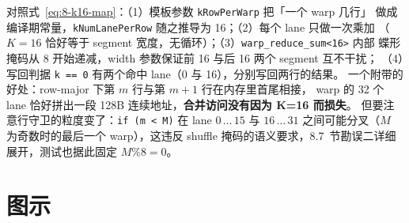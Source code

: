 对照式~\ref{eq:8-k16-map}：（1）模板参数 \texttt{kRowPerWarp} 把「一个 warp 几行」
做成编译期常量，\texttt{k\allowbreak{}Num\allowbreak{}Lane\allowbreak{}Per\allowbreak{}Row} 随之推导为 16；（2）每个 lane 只做一次乘加
（$K=16$ 恰好等于 segment 宽度，无循环）；（3）\texttt{warp\_\allowbreak{}reduce\_\allowbreak{}sum\allowbreak{}<16>} 内部
蝶形掩码从 8 开始递减，width 参数保证前 16 与后 16 两个 segment 互不干扰；
（4）写回判据 \texttt{k == 0} 有两个命中 lane（0 与 16），分别写回两行的结果。
一个附带的好处：row-major 下第 $m$ 行与第 $m+1$ 行在内存里首尾相接，
warp 的 32 个 lane 恰好拼出一段 128B 连续地址，\textbf{合并访问没有因为 K=16 而损失}。
但要注意行守卫的粒度变了：\texttt{if (m < M)} 在 lane $0\,\dots\,15$ 与
$16\,\dots\,31$ 之间可能分叉（$M$ 为奇数时的最后一个 warp），这违反 shuffle
掩码的语义要求，8.7~节勘误二详细展开，测试也据此固定 $M \% 8 = 0$。

\needspace{92mm}

\section{图示}

